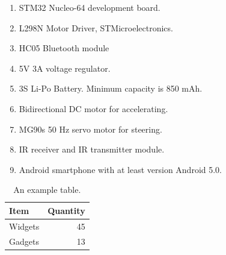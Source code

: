 \begin{enumerate}
    \item STM32 Nucleo-64 development board.
    \item L298N Motor Driver, STMicroelectronics\texttrademark.
    \item HC05 Bluetooth module
    \item 5V 3A voltage regulator.
    \item 3S Li-Po Battery. Minimum capacity is 850 mAh.
    \item Bidirectional DC motor for accelerating.
    \item MG90s 50 Hz servo motor for steering. 
    \item IR receiver and IR transmitter module.
    \item Android smartphone with at least version Android 5.0.
\end{enumerate}

\begin{table}[!htbp]
    \centering
    \caption{\label{tab:widgets}An example table.}
    \begin{tabular}{l|r}
        Item & Quantity \\\hline
        Widgets & 45 \\
        Gadgets & 13
    \end{tabular}
\end{table}